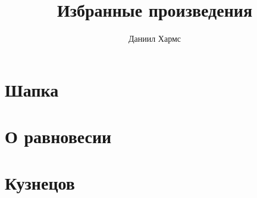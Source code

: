 \documentclass{article}
\begin{document}
\author{Даниил Хармс}
\date{}
\title{Избранные произведения}
\maketitle

\section*{Шапка}



\section*{О равновесии}


					  
\section*{Кузнецов}


\end{document}
